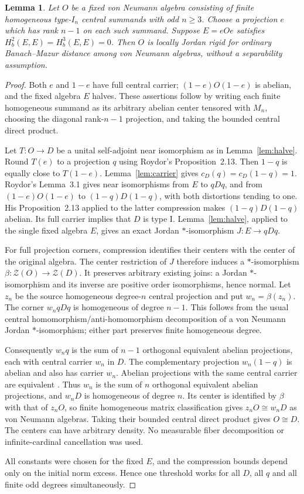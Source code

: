\documentclass[11pt]{article}
\newtheorem{lemma}[theorem]{Lemma}
\newcommand{\Hb}{H_b}
\newcommand{\Z}{\mathcal Z}
\begin{document}
\begin{lemma}\label{lem:odd}
Let $O$ be a fixed von Neumann algebra consisting of finite homogeneous
type-$I_n$ central summands with odd $n\ge3$. Choose a projection $e$
which has rank $n-1$ on each such summand. Suppose
$E=eOe$ satisfies $\Hb^2(E,E)=\Hb^3(E,E)=0$. Then $O$ is locally
Jordan rigid for ordinary Banach--Mazur distance among von Neumann
algebras, without a separability assumption.
\end{lemma}
\begin{proof}
Both $e$ and $1-e$ have full central carrier; $(1-e)O(1-e)$ is
abelian, and the fixed algebra $E$ halves. These assertions follow by
writing each finite homogeneous summand as its arbitrary abelian center
tensored with $M_n$, choosing the diagonal rank-$n-1$ projection,
and taking the bounded central direct product.

Let $T:O\to D$ be a unital self-adjoint near isomorphism as in
Lemma~\ref{lem:halve}. Round $T(e)$ to a projection $q$ using Roydor's
Proposition~2.13. Then $1-q$ is equally close to $T(1-e)$.
Lemma~\ref{lem:carrier} gives $c_D(q)=c_D(1-q)=1$.
Roydor's Lemma~3.1 gives near isomorphisms from $E$ to $qDq$, and
from $(1-e)O(1-e)$ to $(1-q)D(1-q)$, with both distortions tending
to one. His Proposition~2.13 applied to the latter compression makes
$(1-q)D(1-q)$ abelian. Its full carrier implies that $D$ is type I.
Lemma~\ref{lem:halve}, applied to the single fixed algebra $E$, gives
an exact Jordan $*$-isomorphism $J:E\to qDq$.

For full projection corners, compression identifies their centers with
the center of the original algebra. The center restriction of $J$
therefore induces a $*$-isomorphism $\beta:\Z(O)\to\Z(D)$.
It preserves arbitrary existing joins: a Jordan $*$-isomorphism and
its inverse are positive order isomorphisms, hence normal.
Let $z_n$ be the source homogeneous degree-$n$ central projection and
put $w_n=\beta(z_n)$. The corner $w_nqDq$ is homogeneous of degree
$n-1$. This follows from the usual central homomorphism/anti-homomorphism
decomposition of a von Neumann Jordan $*$-isomorphism; either part
preserves finite homogeneous degree.

Consequently $w_nq$ is the sum of $n-1$ orthogonal equivalent abelian
projections, each with central carrier $w_n$ in $D$. The complementary
projection $w_n(1-q)$ is abelian and also has carrier $w_n$.
Abelian projections with the same central carrier are equivalent
\cite{KR,Takesaki}. Thus $w_n$ is the sum of $n$ orthogonal equivalent
abelian projections, and $w_nD$ is homogeneous of degree $n$.
Its center is identified by $\beta$ with that of $z_nO$, so finite
homogeneous matrix classification gives $z_nO\cong w_nD$ as von
Neumann algebras. Taking their bounded central direct product gives
$O\cong D$. The centers can have arbitrary density. No measurable
fiber decomposition or infinite-cardinal cancellation was used.

All constants were chosen for the fixed $E$, and the compression
bounds depend only on the initial norm excess. Hence one threshold
works for all $D$, all $q$ and all finite odd degrees simultaneously.
\end{proof}
\end{document}
